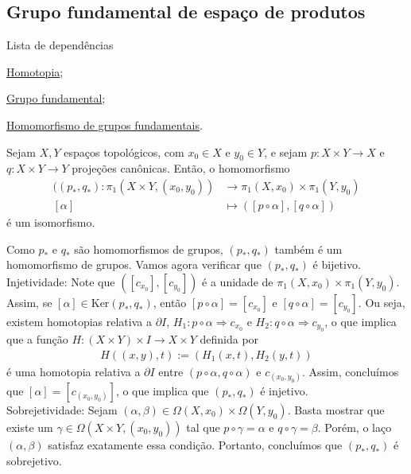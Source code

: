 \subsection{Grupo fundamental de espaço de produtos}
\label{grupo-fundamental-de-espaco-de-produtos-prop}
\begin{titlemize}{Lista de dependências}
    \item \hyperref[homotopia-def]{Homotopia};\\
    \item \hyperref[grupo-fundamental]{Grupo fundamental};\\
    \item \hyperref[hom-grupo-fundamental]{Homomorfismo de grupos fundamentais}.
\end{titlemize}

\begin{prop}
    Sejam $X,Y$ espaços topológicos, com $x_0\in X$ e $y_0\in Y$, e sejam $p:X\times Y\rightarrow X$ e $q:X\times Y\rightarrow Y$ projeções canônicas. Então, o homomorfismo
    \begin{align*}
        ((p_*,q_*):\pi_1(X\times Y,(x_0,y_0))&\longrightarrow \pi_1 (X,x_0)\times \pi_1(Y,y_0)\\
        [\alpha]&\longmapsto ([p\circ \alpha],[q\circ \alpha]) 
    \end{align*}
    é um isomorfismo.
\end{prop}

\begin{dem}
    Como $p_*$ e $q_*$ são homomorfismos de grupos, $(p_*,q_*)$ também é um homomorfismo de grupos. Vamos agora verificar que $(p_*,q_*)$ é bijetivo.\\
    Injetividade: Note que $([c_{x_0}],[c_{y_0}])$ é a unidade de $\pi_1 (X,x_0)\times \pi_1(Y,y_0)$. Assim, se $[\alpha]\in \text{Ker}(p_*,q_*)$, então $[p\circ \alpha]=[c_{x_0}]$ e $[q\circ \alpha]=[c_{y_0}]$. Ou seja, existem homotopias relativa a $\partial I$, $H_1:p\circ\alpha \Rightarrow c_{x_0}$ e $H_2:q\circ \alpha \Rightarrow c_{y_0}$, o que implica que a função $H:(X\times Y)\times I\rightarrow X\times Y$ definida por
    \begin{align*}
        H((x,y),t):=(H_1(x,t),H_2(y,t))
    \end{align*}
    é uma homotopia relativa a $\partial I$ entre $(p\circ \alpha,q\circ\alpha)$ e $c_{(x_0,y_0)}$. Assim, concluímos que $[\alpha]=[c_{(x_0,y_0)}]$, o que implica que $(p_*,q_*)$ é injetivo.\\
    Sobrejetividade: Sejam $(\alpha,\beta)\in \Omega(X,x_0)\times \Omega(Y,y_0)$. Basta mostrar que existe um $\gamma\in \Omega(X\times Y,(x_0,y_0))$ tal que $p\circ\gamma=\alpha$ e $q\circ \gamma=\beta$. Porém, o laço $(\alpha,\beta)$ satisfaz exatamente essa condição. Portanto, concluímos que $(p_*,q_*)$ é sobrejetivo.
\end{dem}

